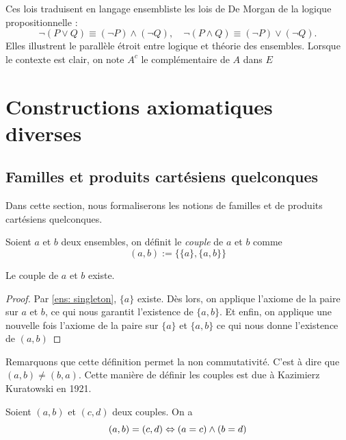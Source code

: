 \begin{remarque}
	Ces lois traduisent en langage ensembliste les lois de De Morgan de la logique propositionnelle :
	\[
	\neg(P\lor Q)\equiv (\neg P)\land(\neg Q),
	\quad
	\neg(P\land Q)\equiv (\neg P)\lor(\neg Q).
	\]
	Elles illustrent le parallèle étroit entre logique et théorie des ensembles.
    Lorsque le contexte est clair, on note $A^c$ le complémentaire de $A$ dans $E$
\end{remarque}

\section{Constructions axiomatiques diverses}

\subsection{Familles et produits cartésiens quelconques}
Dans cette section, nous formaliserons les notions de familles et de produits cartésiens quelconques.

\begin{definition}[couple]
    Soient $a$ et $b$ deux ensembles, on définit le \emph{couple} de $a$ et $b$ comme
    \[
    (a,b):= \{\{a\},\{a,b\}\}
    \]
\end{definition}

\begin{proposition}\label{ens : couple : existence}
    Le couple de $a$ et $b$ existe.
\end{proposition}

\begin{proof}
    Par \ref{ens: singleton}, $\{a\}$ existe. Dès lors, on applique l'axiome de la paire sur $a$ et $b$, ce qui nous garantit l'existence de $\{a,b\}$. Et enfin, on applique une nouvelle fois l'axiome de la paire sur $\{a\}$ et $\{a,b\}$ ce qui nous donne l'existence de $(a,b)$
\end{proof}

\begin{remarque}
    Remarquons que cette définition permet la non commutativité. C'est à dire que $(a,b)\neq (b, a)$. Cette manière de définir les couples est due à Kazimierz Kuratowski en 1921.
\end{remarque}

\begin{proposition}
    Soient $(a,b)$ et $(c,d)$ deux couples. On a
    \[
    (a,b)=(c,d) \Leftrightarrow (a=c)\land(b=d)
    \]
\end{proposition}

